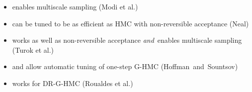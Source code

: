 \documentclass[10pt]{report}
\begin{document}
\begin{itemize}
\item {} enables multiscale sampling
  \hfill {\small (Modi et al.)}
\item {} can be tuned to be as efficient as HMC with
  non-reversible acceptance
  \hfill {\small (Neal)}
\item {} works as well as non-reversible acceptance
  \textit{and}\ enables multiscale sampling
  \hfill {\small (Turok et al.)}
\item {} and  allow automatic tuning of one-step G-HMC
  \hfill {\small (Hoffman~and~Sountsov)}
\item {} works for DR-G-HMC
  \hfill {\small (Roualdes et al.)}
\end{itemize}
  
\end{document}
